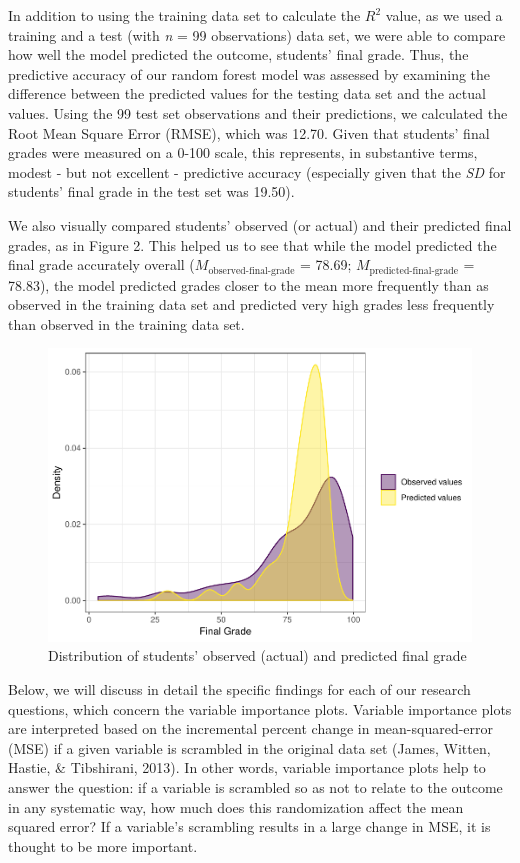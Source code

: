 \documentclass[acmart]{apa6}
\theoremstyle{definition}
\theoremstyle{definition}
\theoremstyle{definition}
\theoremstyle{remark}
\begin{document}
In addition to using the training data set to calculate the \(R^2\)
value, as we used a training and a test (with \emph{n} = 99
observations) data set, we were able to compare how well the model
predicted the outcome, students' final grade. Thus, the predictive
accuracy of our random forest model was assessed by examining the
difference between the predicted values for the testing data set and the
actual values. Using the 99 test set observations and their predictions,
we calculated the Root Mean Square Error (RMSE), which was 12.70. Given
that students' final grades were measured on a 0-100 scale, this
represents, in substantive terms, modest - but not excellent -
predictive accuracy (especially given that the \emph{SD} for students'
final grade in the test set was 19.50).

We also visually compared students' observed (or actual) and their
predicted final grades, as in Figure 2. This helped us to see that while
the model predicted the final grade accurately overall
(\(M_{\text{observed-final-grade}}\) = 78.69;
\(M_{\text{predicted-final-grade}}\) = 78.83), the model predicted
grades closer to the mean more frequently than as observed in the
training data set and predicted very high grades less frequently than
observed in the training data set.

\begin{figure}
\centering
\includegraphics{LAK_Manuscript_files/figure-latex/unnamed-chunk-3-1.pdf}
\caption{\label{fig:unnamed-chunk-3}Distribution of students' observed
(actual) and predicted final grade}
\end{figure}

Below, we will discuss in detail the specific findings for each of our
research questions, which concern the variable importance plots.
Variable importance plots are interpreted based on the incremental
percent change in mean-squared-error (MSE) if a given variable is
scrambled in the original data set (James, Witten, Hastie, \&
Tibshirani, 2013). In other words, variable importance plots help to
answer the question: if a variable is scrambled so as not to relate to
the outcome in any systematic way, how much does this randomization
affect the mean squared error? If a variable's scrambling results in a
large change in MSE, it is thought to be more important.
\end{document}
